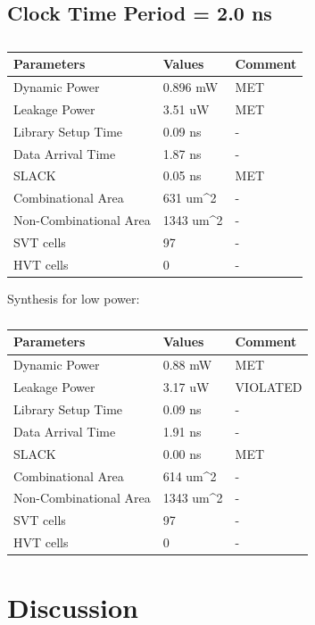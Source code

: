 \documentclass[11pt,a4paper]{article}
\begin{document}
\newpage
\subsection{Clock Time Period = 2.0 ns}
\begin{table}[htbp]
\begin{center}
\begin{tabular}{|l|l|l|}
\hline
\textbf{Parameters}	& \textbf{Values}		& \textbf{Comment}\\ \hline
Dynamic Power				&	0.896 mW			& MET\\ \hline
Leakage Power 			&	3.51 uW				& MET \\ \hline
Library Setup Time  & 0.09 ns				& - \\ \hline
Data Arrival Time		& 1.87 ns				& - \\ \hline
SLACK								& 0.05 ns				& MET \\ \hline
Combinational Area	& 631 um^2			& - \\ \hline
Non-Combinational Area	& 1343 um^2	& - \\ \hline
SVT cells						& 97						& - \\ \hline
HVT cells						& 0							& - \\ \hline
\end{tabular}
\end{center}
\caption{}
\label{tab:syn2.0.1}
\end{table}

Synthesis for low power:

\begin{table}[htbp]
\begin{center}
\begin{tabular}{|l|l|l|}
\hline
\textbf{Parameters}	& \textbf{Values}		& \textbf{Comment}\\ \hline
Dynamic Power				&	0.88 mW				& MET\\ \hline
Leakage Power 			&	3.17 uW				& VIOLATED\\ \hline
Library Setup Time  & 0.09 ns				& - \\ \hline
Data Arrival Time		& 1.91 ns				& - \\ \hline
SLACK								& 0.00 ns			& MET\\ \hline
Combinational Area	& 614 um^2			& - \\ \hline
Non-Combinational Area	& 1343 um^2	& - \\ \hline
SVT cells						& 97						& - \\ \hline
HVT cells						& 0							& - \\ \hline
\end{tabular}
\end{center}
\caption{}
\label{tab:syn2.0.2}
\end{table}

\FloatBarrier
\section{Discussion}
\end{document}
